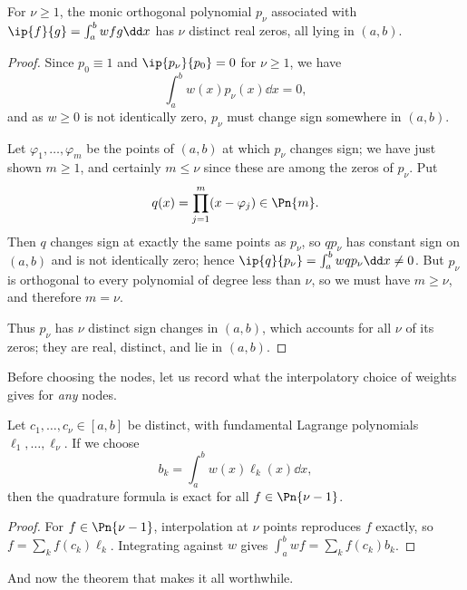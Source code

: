 \begin{theorem}\label{thm:oproots}
  For $\nu \geq 1$, the monic orthogonal polynomial $p_\nu$ associated with $\ip{f}{g} = \int_a^b wfg\dd x$ has $\nu$ distinct real zeros, all lying in $(a,b)$.
\end{theorem}
\begin{proof}
  Since $p_0 \equiv 1$ and $\ip{p_\nu}{p_0} = 0$ for $\nu \geq 1$, we have
  $$
  \int_a^b w(x)p_\nu(x)\dd x = 0,
  $$
  and as $w \geq 0$ is not identically zero, $p_\nu$ must change sign somewhere in $(a,b)$.

  Let $\varphi_1, \dots, \varphi_m$ be the points of $(a,b)$ at which $p_\nu$ changes sign; we have just shown $m \geq 1$, and certainly $m \leq \nu$ since these are among the zeros of $p_\nu$. Put
  $$
  q(x) = \prod_{j=1}^{m}(x - \varphi_j) \in \Pn{m}.
  $$
  Then $q$ changes sign at exactly the same points as $p_\nu$, so $qp_\nu$ has constant sign on $(a,b)$ and is not identically zero; hence $\ip{q}{p_\nu} = \int_a^b w q p_\nu \dd x \neq 0$. But $p_\nu$ is orthogonal to every polynomial of degree less than $\nu$, so we must have $m \geq \nu$, and therefore $m = \nu$.

  Thus $p_\nu$ has $\nu$ distinct sign changes in $(a,b)$, which accounts for all $\nu$ of its zeros; they are real, distinct, and lie in $(a,b)$.
\end{proof}

Before choosing the nodes, let us record what the interpolatory choice of weights gives for \emph{any} nodes.

\begin{theorem}\label{thm:ordquad}
  Let $c_1, \dots, c_\nu \in [a,b]$ be distinct, with fundamental Lagrange polynomials $\ell_1, \dots, \ell_\nu$. If we choose
  $$
  b_k = \int_a^b w(x)\ell_k(x)\dd x,
  $$
  then the quadrature formula is exact for all $f \in \Pn{\nu - 1}$.
\end{theorem}
\begin{proof}
  For $f \in \Pn{\nu-1}$, interpolation at $\nu$ points reproduces $f$ exactly, so $f = \sum_k f(c_k)\ell_k$. Integrating against $w$ gives $\int_a^b wf = \sum_k f(c_k) b_k$.
\end{proof}

And now the theorem that makes it all worthwhile.

